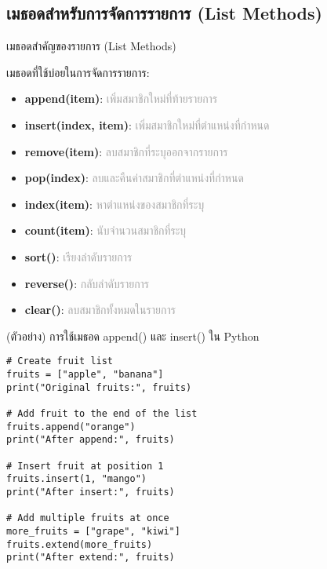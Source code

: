 \documentclass[12pt,a4paper]{article}
\newcommand{\textlight}[1]{{\thailightfont #1}}
\begin{document}
\subsection{เมธอดสำหรับการจัดการรายการ (List Methods)}

\hspace{1cm}\textlight{เมธอด (Methods) คือฟังก์ชันพิเศษที่ผูกติดกับ List และช่วยให้เราจัดการข้อมูลได้สะดวกขึ้น คิดเหมือนกับปุ่มกดต่างๆ บนรีโมทคอนโทรล แต่ละปุ่มมีหน้าที่เฉพาะ เช่น เพิ่มข้อมูล ลบข้อมูล หรือจัดเรียงข้อมูล การเรียนรู้เมธอดเหล่านี้จะช่วยให้นักศึกษาเขียนโปรแกรมได้อย่างมีประสิทธิภาพและลดความซับซ้อนของโค้ด}

\begin{noticebox}{เมธอดสำคัญของรายการ (List Methods)}

\textlight{เมธอดที่ใช้บ่อยในการจัดการรายการ:}

\begin{itemize}
    \item \textbf{append(item)}: \textcolor{darkgray}{เพิ่มสมาชิกใหม่ที่ท้ายรายการ}
    \item \textbf{insert(index, item)}: \textcolor{darkgray}{เพิ่มสมาชิกใหม่ที่ตำแหน่งที่กำหนด}
    \item \textbf{remove(item)}: \textcolor{darkgray}{ลบสมาชิกที่ระบุออกจากรายการ}
    \item \textbf{pop(index)}: \textcolor{darkgray}{ลบและคืนค่าสมาชิกที่ตำแหน่งที่กำหนด}
    \item \textbf{index(item)}: \textcolor{darkgray}{หาตำแหน่งของสมาชิกที่ระบุ}
    \item \textbf{count(item)}: \textcolor{darkgray}{นับจำนวนสมาชิกที่ระบุ}
    \item \textbf{sort()}: \textcolor{darkgray}{เรียงลำดับรายการ}
    \item \textbf{reverse()}: \textcolor{darkgray}{กลับลำดับรายการ}
    \item \textbf{clear()}: \textcolor{darkgray}{ลบสมาชิกทั้งหมดในรายการ}
\end{itemize}

\end{noticebox}

\begin{codebox}{(ตัวอย่าง) การใช้เมธอด append() และ insert() ใน Python}
\begin{lstlisting}[style=python]
# Create fruit list
fruits = ["apple", "banana"]
print("Original fruits:", fruits)

# Add fruit to the end of the list
fruits.append("orange")
print("After append:", fruits)

# Insert fruit at position 1
fruits.insert(1, "mango")
print("After insert:", fruits)

# Add multiple fruits at once
more_fruits = ["grape", "kiwi"]
fruits.extend(more_fruits)
print("After extend:", fruits)
\end{lstlisting}
\end{codebox}
\end{document}
